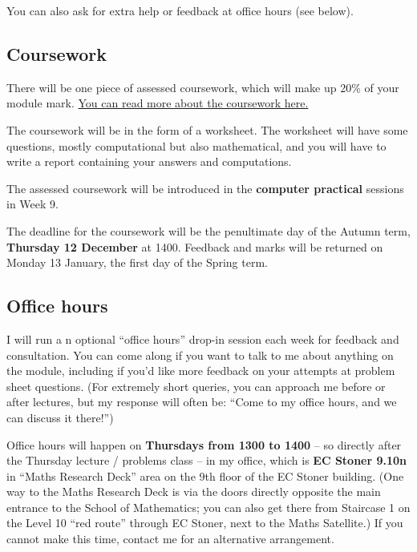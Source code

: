\documentclass[
  letterpaper,
  DIV=11,
  numbers=noendperiod]{scrreprt}
\theoremstyle{plain}
\theoremstyle{definition}
\theoremstyle{definition}
\theoremstyle{remark}
\begin{document}
You can also ask for extra help or feedback at office hours (see below).

\subsection*{Coursework}\label{coursework}

There will be one piece of assessed coursework, which will make up 20\%
of your module mark. \hyperref[coursework]{You can read more about the
coursework here.}

The coursework will be in the form of a worksheet. The worksheet will
have some questions, mostly computational but also mathematical, and you
will have to write a report containing your answers and computations.

The assessed coursework will be introduced in the \textbf{computer
practical} sessions in Week 9.

The deadline for the coursework will be the penultimate day of the
Autumn term, \textbf{Thursday 12 December } at 1400. Feedback and marks
will be returned on Monday 13 January, the first day of the Spring term.

\subsection*{Office hours}\label{office-hours}

I will run a n optional ``office hours'' drop-in session each week for
feedback and consultation. You can come along if you want to talk to me
about anything on the module, including if you'd like more feedback on
your attempts at problem sheet questions. (For extremely short queries,
you can approach me before or after lectures, but my response will often
be: ``Come to my office hours, and we can discuss it there!'')

Office hours will happen on \textbf{Thursdays from 1300 to 1400} -- so
directly after the Thursday lecture / problems class -- in my office,
which is \textbf{EC Stoner 9.10n} in ``Maths Research Deck'' area on the
9th floor of the EC Stoner building. (One way to the Maths Research Deck
is via the doors directly opposite the main entrance to the School of
Mathematics; you can also get there from Staircase 1 on the Level 10
``red route'' through EC Stoner, next to the Maths Satellite.) If you
cannot make this time, contact me for an alternative arrangement.
\end{document}
